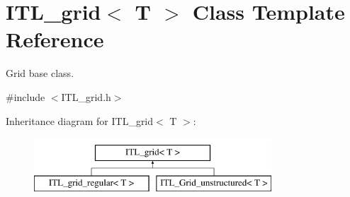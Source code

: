 \hypertarget{classITL__grid}{
\section{ITL\_\-grid$<$ T $>$ Class Template Reference}
\label{classITL__grid}
}


Grid base class.  




{\ttfamily \#include $<$ITL\_\-grid.h$>$}

Inheritance diagram for ITL\_\-grid$<$ T $>$:\begin{figure}[H]
\begin{center}
\leavevmode
\includegraphics[height=2cm]{classITL__grid}
\end{center}
\end{figure}
